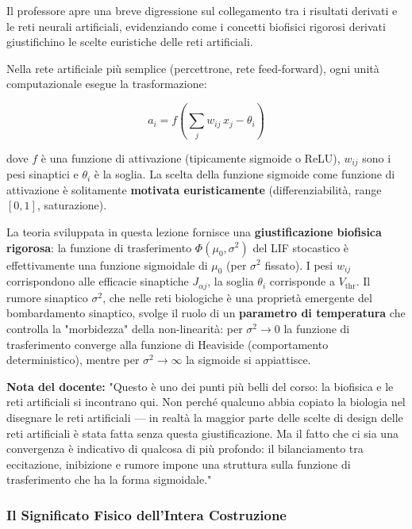 Il professore apre una breve digressione sul collegamento tra i risultati derivati e le reti neurali artificiali, evidenziando come i concetti biofisici rigorosi derivati giustifichino le scelte euristiche delle reti artificiali.

Nella rete artificiale più semplice (percettrone, rete feed-forward), ogni unità computazionale esegue la trasformazione:

\begin{equation}
a_i = f\!\left(\sum_j w_{ij}\, x_j - \theta_i\right)
\end{equation}

dove $f$ è una funzione di attivazione (tipicamente sigmoide o ReLU), $w_{ij}$ sono i pesi sinaptici e $\theta_i$ è la soglia. La scelta della funzione sigmoide come funzione di attivazione è solitamente \textbf{motivata euristicamente} (differenziabilità, range $[0,1]$, saturazione).

La teoria sviluppata in questa lezione fornisce una \textbf{giustificazione biofisica rigorosa}: la funzione di trasferimento $\Phi(\mu_0, \sigma^2)$ del LIF stocastico è effettivamente una funzione sigmoidale di $\mu_0$ (per $\sigma^2$ fissato). I pesi $w_{ij}$ corrispondono alle efficacie sinaptiche $J_{\alpha j}$, la soglia $\theta_i$ corrisponde a $V_{\text{thr}}$. Il rumore sinaptico $\sigma^2$, che nelle reti biologiche è una proprietà emergente del bombardamento sinaptico, svolge il ruolo di un \textbf{parametro di temperatura} che controlla la "morbidezza" della non-linearità: per $\sigma^2 \to 0$ la funzione di trasferimento converge alla funzione di Heaviside (comportamento deterministico), mentre per $\sigma^2 \to \infty$ la sigmoide si appiattisce.

\begin{tcolorbox}[colback=gray!5, colframe=gray!40, arc=2mm, boxrule=0.5pt]
\textbf{Nota del docente:} "Questo è uno dei punti più belli del corso: la biofisica e le reti artificiali si incontrano qui. Non perché qualcuno abbia copiato la biologia nel disegnare le reti artificiali — in realtà la maggior parte delle scelte di design delle reti artificiali è stata fatta senza questa giustificazione. Ma il fatto che ci sia una convergenza è indicativo di qualcosa di più profondo: il bilanciamento tra eccitazione, inibizione e rumore impone una struttura sulla funzione di trasferimento che ha la forma sigmoidale."
\end{tcolorbox}

\subsubsection{Il Significato Fisico dell'Intera Costruzione}

